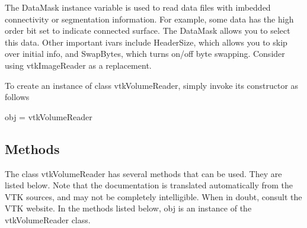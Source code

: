 The Data\-Mask instance variable is used to read data files with imbedded connectivity or segmentation information. For example, some data has the high order bit set to indicate connected surface. The Data\-Mask allows you to select this data. Other important ivars include Header\-Size, which allows you to skip over initial info, and Swap\-Bytes, which turns on/off byte swapping. Consider using vtk\-Image\-Reader as a replacement.

To create an instance of class vtk\-Volume\-Reader, simply invoke its constructor as follows \begin{DoxyVerb}  obj = vtkVolumeReader
\end{DoxyVerb}
 \hypertarget{vtkwidgets_vtkxyplotwidget_Methods}{}\subsection{Methods}\label{vtkwidgets_vtkxyplotwidget_Methods}
The class vtk\-Volume\-Reader has several methods that can be used. They are listed below. Note that the documentation is translated automatically from the V\-T\-K sources, and may not be completely intelligible. When in doubt, consult the V\-T\-K website. In the methods listed below, {\ttfamily obj} is an instance of the vtk\-Volume\-Reader class. 
